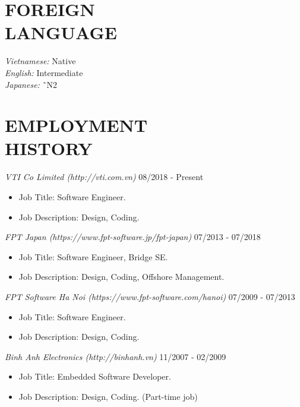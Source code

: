 \documentclass[margin]{res}
\begin{document}
\begin{resume}
\section{FOREIGN \\ LANGUAGE}
         {\sl Vietnamese:} Native  \\
         {\sl English:}  Intermediate\\
         {\sl Japanese:} \~\ N2  \\

 
\section{EMPLOYMENT \\ HISTORY}
		{\sl VTI Co Limited (http://vti.com.vn)}  \hfill 08/2018 - Present
                 \begin{itemize}  \itemsep -2pt  %
                 \item Job Title: Software Engineer.
		 \item Job Description:  Design, Coding. 
                 \end{itemize}

		{\sl FPT Japan (https://www.fpt-software.jp/fpt-japan)}  \hfill 07/2013 - 07/2018
                 \begin{itemize}  \itemsep -2pt  %
                 \item Job Title: Software Engineer, Bridge SE.
		 \item Job Description:  Design, Coding, Offshore Management. 
                 \end{itemize}

		 {\sl FPT Software Ha Noi (https://www.fpt-software.com/hanoi)}  \hfill 07/2009 - 07/2013
                 \begin{itemize}  \itemsep -2pt  %
                 \item Job Title: Software Engineer.
		 \item Job Description: Design, Coding.
                 \end{itemize}

		 {\sl Binh Anh Electronics (http://binhanh.vn)}   \hfill 11/2007 - 02/2009
                 \begin{itemize}  \itemsep -2pt  %
		 \item Job Title: Embedded Software Developer. 
		 \item Job Description: Design, Coding. (Part-time job)
                 \end{itemize}
        

\end{resume}
\end{document}

